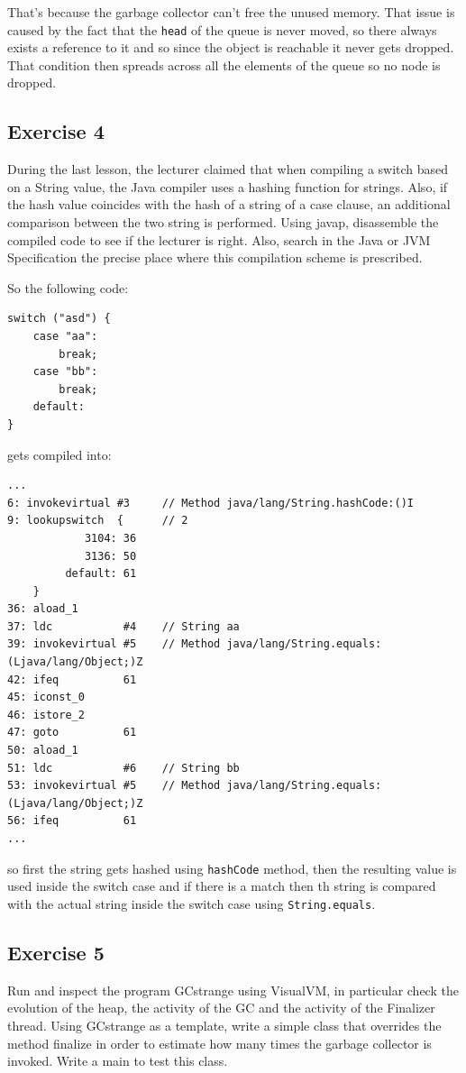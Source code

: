 That's because the garbage collector can't free the unused memory.
That issue is caused by the fact that the \verb|head| of the queue is never moved, so there always exists a reference to it and so since the object is reachable it never gets dropped.
That condition then spreads across all the elements of the queue so no node is dropped.

\subsection{Exercise 4}
During the last lesson, the lecturer claimed that when compiling a switch based on a String value, the Java compiler uses a hashing function for strings.
Also, if the hash value coincides with the hash of a string of a case clause, an additional comparison between the two string is performed.
Using javap, disassemble the compiled code to see if the lecturer is right.
Also, search in the Java or JVM Specification the precise place where this compilation scheme is prescribed.

So the following code:
\begin{verbatim}
switch ("asd") {
    case "aa":
        break;
    case "bb":
        break;
    default:
}
\end{verbatim}
gets compiled into:
\begin{verbatim}
...
6: invokevirtual #3     // Method java/lang/String.hashCode:()I
9: lookupswitch  {      // 2
            3104: 36
            3136: 50
         default: 61
    }
36: aload_1
37: ldc           #4    // String aa
39: invokevirtual #5    // Method java/lang/String.equals:(Ljava/lang/Object;)Z
42: ifeq          61
45: iconst_0
46: istore_2
47: goto          61
50: aload_1
51: ldc           #6    // String bb
53: invokevirtual #5    // Method java/lang/String.equals:(Ljava/lang/Object;)Z
56: ifeq          61
...
\end{verbatim}
so first the string gets hashed using \verb|hashCode| method, then the resulting value is used inside the switch case and if there is a match then th string is compared with the actual string inside the switch case using \verb|String.equals|.

\subsection{Exercise 5}
Run and inspect the program GCstrange using VisualVM, in particular check the evolution of the heap, the activity of the GC and the activity of the Finalizer thread.
Using GCstrange as a template, write a simple class that overrides the method finalize in order to estimate how many times the garbage collector is invoked.
Write a main to test this class.

